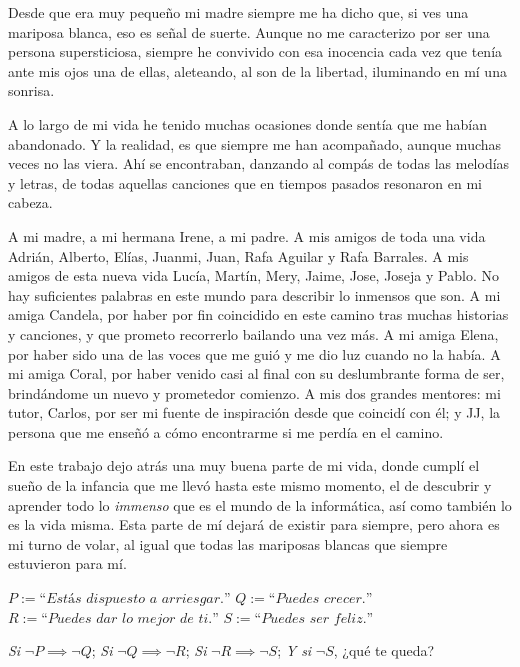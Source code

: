 Desde que era muy pequeño mi madre siempre me ha dicho que, si ves una mariposa blanca, eso es señal de suerte. Aunque no me caracterizo por ser una persona supersticiosa, siempre he convivido con esa inocencia cada vez que tenía ante mis ojos una de ellas, aleteando, al son de la libertad, iluminando en mí una sonrisa.

\vspace{0.2cm}

A lo largo de mi vida he tenido muchas ocasiones donde sentía que me habían abandonado. Y la realidad, es que siempre me han acompañado, aunque muchas veces no las viera. Ahí se encontraban, danzando al compás de todas las melodías y letras, de todas aquellas canciones que en tiempos pasados resonaron en mi cabeza.

\vspace{0.2cm} 

A mi madre, a mi hermana Irene, a mi padre. A mis amigos de toda una vida Adrián, Alberto, Elías, Juanmi, Juan, Rafa Aguilar y Rafa Barrales. A mis amigos de esta nueva vida Lucía, Martín, Mery, Jaime, Jose, Joseja y Pablo. No hay suficientes palabras en este mundo para describir lo inmensos que son. A mi amiga Candela, por haber por fin coincidido en este camino tras muchas historias y canciones, y que prometo recorrerlo bailando una vez más. A mi amiga Elena, por haber sido una de las voces que me guió y me dio luz cuando no la había. A mi amiga Coral, por haber venido casi al final con su deslumbrante forma de ser, brindándome un nuevo y prometedor comienzo. A mis dos grandes mentores: mi tutor, Carlos, por ser mi fuente de inspiración desde que coincidí con él; y JJ, la persona que me enseñó a cómo encontrarme si me perdía en el camino.

\vspace{0.2cm}
En este trabajo dejo atrás una muy buena parte de mi vida, donde cumplí el sueño de la infancia que me llevó hasta este mismo momento, el de descubrir y aprender todo lo \textit{immenso} que es el mundo de la informática, así como también lo es la vida misma. Esta parte de mí dejará de existir para siempre, pero ahora es mi turno de volar, al igual que todas las mariposas blancas que siempre estuvieron para mí.

\newpage
\vspace*{\fill}

\large
\noindent
$P := \textit{``Estás dispuesto a arriesgar.''}$
\newline
$Q := \textit{``Puedes crecer.''}$
\newline
$R := \textit{``Puedes dar lo mejor de ti.''}$
\newline
$S := \textit{``Puedes ser feliz.''}$
\newline
\newline

\noindent
\textit{Si} $\neg P \implies \neg Q$;
\newline
\textit{Si} $\neg Q \implies \neg R$;
\newline
\textit{Si} $\neg R \implies \neg S$;
\newline
\textit{Y si} $\neg S$, ¿qué te queda?
\newline



\vspace*{\fill}